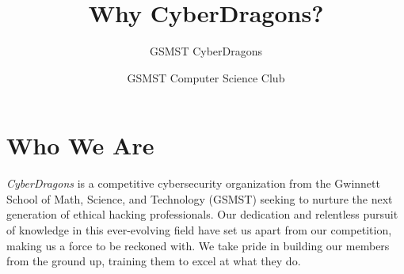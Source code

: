 \documentclass[
  letterpaper,
  DIV=11,
  numbers=noendperiod]{scrartcl}
\title{Why CyberDragons?}
\author{GSMST CyberDragons \and GSMST Computer Science Club}
\date{}
\renewcommand*\contentsname{Table of contents}
\newcommand\contentsname{Table of contents}
\begin{document}
\maketitle
{}
\ifdefined\Shaded\renewenvironment{Shaded}{\begin{tcolorbox}[interior hidden, enhanced, borderline west={3pt}{0pt}{shadecolor}, sharp corners, frame hidden, breakable, boxrule=0pt]}{\end{tcolorbox}}\fi

\renewcommand*\contentsname{Table of Contents}
{
\hypersetup{linkcolor=}
\setcounter{tocdepth}{4}
\tableofcontents
}
\newpage{}

\hypertarget{who-we-are}{%
\section{Who We Are}\label{who-we-are}}

\emph{CyberDragons} is a competitive cybersecurity organization from the
Gwinnett School of Math, Science, and Technology (GSMST) seeking to
nurture the next generation of ethical hacking professionals. Our
dedication and relentless pursuit of knowledge in this ever-evolving
field have set us apart from our competition, making us a force to be
reckoned with. We take pride in building our members from the ground up,
training them to excel at what they do.
\end{document}
